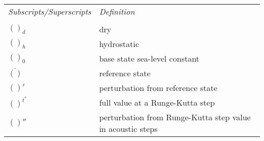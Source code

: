 \newpage
\normalsize
\begin{tabular}{ l p{5.5in} }
{\em Subscripts/Superscripts}  & {\em Definition} \\
\\
$()_d$         & dry \\
$()_h$         & hydrostatic \\
$()_0$         & base state sea-level constant \\
$\overline{()}$ & reference state \\
$()'$          & perturbation from reference state \\
$()^{t^*}$     & full value at a Runge-Kutta step \\
$()''$         & perturbation from Runge-Kutta step value in acoustic steps \\
\end{tabular}

